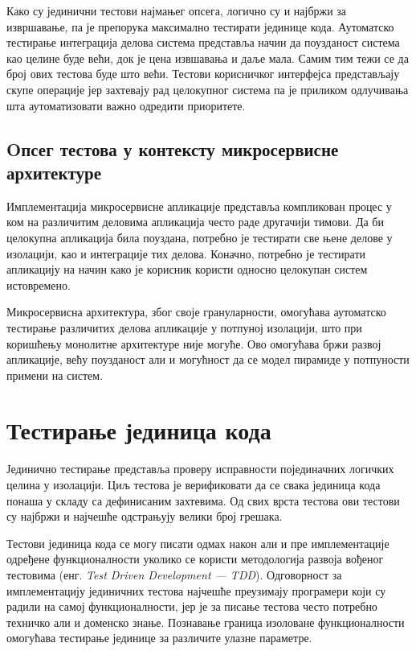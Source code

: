 \documentclass[12pt,oneside]{memoir}
\begin{document}
Како су јединични тестови најмањег опсега, логично су и најбржи за извршавање, па је препорука максимално тестирати јединице кода. Аутоматско тестирање интеграција делова система представља начин да поузданост система као целине буде већи, док је цена извшавања и даље мала. Самим тим тежи се да број ових тестова буде што већи. Тестови корисничког интерфејса представљају скупе операције јер захтевају рад целокупног система па је приликом одлучивања шта аутоматизовати важно одредити приоритете.

\subsection{Oпсег тестова у контексту микросервисне архитектуре}

Имплементација микросервисне апликације представља компликован процес у ком на различитим деловима апликација често раде другачији тимови. Да би целокупна апликација била поуздана, потребно је тестирати све њене делове у изолацији, као и интеграције тих делова. Коначно, потребно је тестирати апликацију на начин како је корисник користи односно целокупан систем истовремено.

Микросервисна архитектура, због своје грануларности, омогућава аутоматско тестирање различитих делова апликације у потпуној изолацији, што при коришћењу монолитне архитектуре није могуће. Ово омогућава бржи развој апликације, већу поузданост али и могућност да се модел пирамиде у потпуности примени на систем. 

\section{Тестирање јединица кода}

Јединично тестирање представља проверу исправности појединачних логичких целина у изолацији. Циљ тестова је верификовати да се свака јединица кода понаша у складу са дефинисаним захтевима. Од свих врста тестова ови тестови су најбржи и најчешће одстрањују велики број грешака. 

Тестови јединица кода се могу писати одмах након али и пре имплементације одређене функционалности уколико се користи методологија развоја вођеног тестовима (енг. \textit{Test Driven Development --- TDD}). Одговорност за имплементацију јединичних тестова најчешће преузимају програмери који су радили на самој функционалности, јер је за писање тестова често потребно техничко али и доменско знање. Познавање граница изоловане функционалности омогућава тестирање  јединице за различите улазне параметре.
\end{document}
